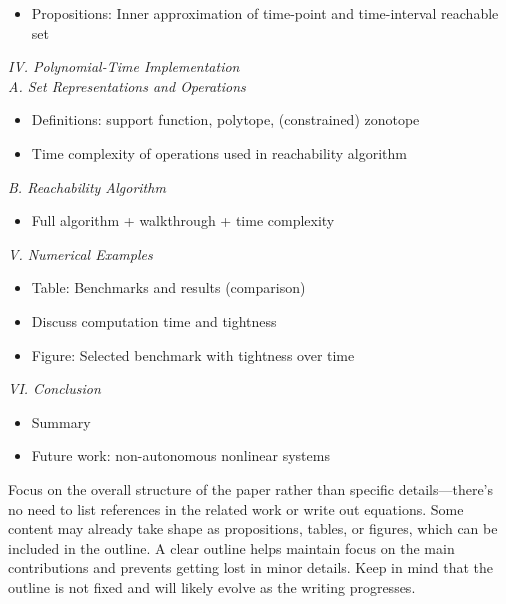 {\begin{itemize}
        \item Propositions: Inner approximation of time-point and time-interval reachable set
    \end{itemize}
    \textit{IV. Polynomial-Time Implementation} \\
    \textit{A. Set Representations and Operations}
    \begin{itemize}
        \item Definitions: support function, polytope, (constrained) zonotope
        \item Time complexity of operations used in reachability algorithm
    \end{itemize}
    \textit{B. Reachability Algorithm}
    \begin{itemize}
        \item Full algorithm + walkthrough + time complexity
    \end{itemize}
    \textit{V. Numerical Examples}
    \begin{itemize}
        \item Table: Benchmarks and results (comparison)
        \item Discuss computation time and tightness
        \item Figure: Selected benchmark with tightness over time
    \end{itemize}
    \textit{VI. Conclusion}
    \begin{itemize}
        \item Summary
        \item Future work: non-autonomous nonlinear systems
    \end{itemize}
}

\noindent 
Focus on the overall structure of the paper rather than specific details---there's no need to list references in the related work or write out equations.
Some content may already take shape as propositions, tables, or figures, which can be included in the outline.
A clear outline helps maintain focus on the main contributions and prevents getting lost in minor details.
Keep in mind that the outline is not fixed and will likely evolve as the writing progresses.
